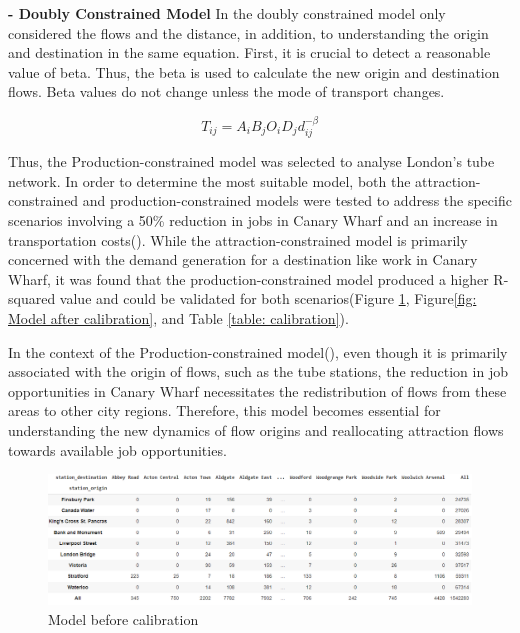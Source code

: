 \documentclass[10pt]{report}
\numberwithin{figure}{section}
\numberwithin{table}{section}
\begin{document}
\vspace{5mm} %
\textbf{- Doubly Constrained Model}
 In the doubly constrained model only considered the flows and the distance, in addition, to understanding the origin and destination in the same equation. First, it is crucial to detect a reasonable value of beta. Thus, the beta is used to calculate the new origin and destination flows. Beta values do not change unless the mode of transport changes. 

\begin{equation} \tag{4}
T_{ij} = A_i B_j O_i D_j d_{ij}^{-\beta}
\end{equation}

\newpage 

Thus, the Production-constrained model was selected to analyse London's tube network. In order to determine the most suitable model, both the attraction-constrained and production-constrained models were tested to address the specific scenarios involving a 50\% reduction in jobs in Canary Wharf and an increase in transportation costs(\cite{flowerdew_fitting_2010}). While the attraction-constrained model is primarily concerned with the demand generation for a destination like work in Canary Wharf, it was found that the production-constrained model produced a higher R-squared value and could be validated for both scenarios(Figure \ref{fig: Model before calibration}, Figure\ref{fig: Model after calibration}, and Table \ref{table: calibration}).

In the context of the Production-constrained model(\cite{pooler_extended_1994}), even though it is primarily associated with the origin of flows, such as the tube stations, the reduction in job opportunities in Canary Wharf necessitates the redistribution of flows from these areas to other city regions. Therefore, this model becomes essential for understanding the new dynamics of flow origins and reallocating attraction flows towards available job opportunities.

    \begin{figure}[htp]
        \centering
        \includegraphics[width=16cm]{Image/Part2_OD.png}
        \caption{Model before calibration}
        \label{fig: Model before calibration}
    \end{figure}
\end{document}
